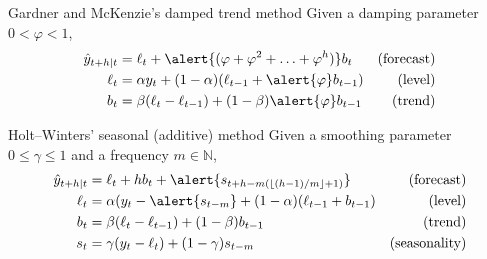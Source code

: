 \documentclass[12pt,aspectratio=169]{beamer}
\newcommand{\N}{\ensuremath{\mathbb{N}}}
\begin{document}
\begin{frame}{Gardner and McKenzie's damped trend method}
    Given a damping parameter $0 < \varphi < 1$,
    \begin{align*}
        \hat{y}_{t + h | t} &= \ell_{t} + \alert{(\varphi + \varphi^{2} + \ldots + \varphi^{h})} b_{t} & \text{(forecast)} \\
        \ell_{t}            &= \alpha y_{t} + (1 - \alpha) (\ell_{t-1} + \alert{\varphi} b_{t-1})      & \text{(level)} \\
        b_{t}               &= \beta (\ell_{t} - \ell_{t-1}) + (1 - \beta) \alert{\varphi} b_{t-1}     & \text{(trend)}
    \end{align*}
\end{frame}

\begin{frame}{Holt--Winters' seasonal (additive) method}
    Given a smoothing parameter $0 \leq \gamma \leq 1$ and a frequency $m \in \N$,
    \begin{align*}
        \hat{y}_{t + h | t} &= \ell_{t} + h b_{t} + \alert{s_{t+h-m(\lfloor (h-1)/m \rfloor+1)}}     & \text{(forecast)} \\
        \ell_{t}            &= \alpha (y_{t} - \alert{s_{t-m}} + (1 - \alpha) (\ell_{t-1} + b_{t-1}) & \text{(level)} \\
        b_{t}               &= \beta (\ell_{t} - \ell_{t-1}) + (1 - \beta) b_{t-1}                   & \text{(trend)} \\
        s_{t}               &= \gamma (y_{t} - \ell_{t}) + (1 - \gamma) s_{t-m}                      & \text{(seasonality)}
    \end{align*}
\end{frame}
\end{document}
